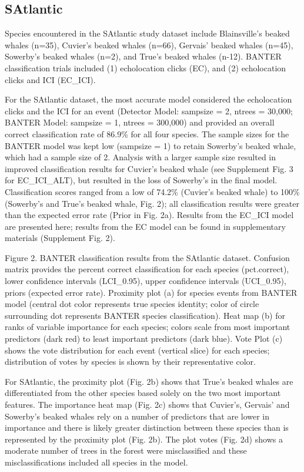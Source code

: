 \documentclass[
  letterpaper,
  DIV=11,
  numbers=noendperiod]{scrartcl}
\begin{document}
\hypertarget{satlantic}{%
\subsection{SAtlantic}\label{satlantic}}

Species encountered in the SAtlantic study dataset include Blainsville's
beaked whales (n=35), Cuvier's beaked whales (n=66), Gervais' beaked
whales (n=45), Sowerby's beaked whales (n=2), and True's beaked whales
(n-12). BANTER classification trials included (1) echolocation clicks
(EC), and (2) echolocation clicks and ICI (EC\_ICI).

For the SAtlantic dataset, the most accurate model considered the
echolocation clicks and the ICI for an event (Detector Model: sampsize =
2, ntrees = 30,000; BANTER Model: sampsize = 1, ntrees = 300,000) and
provided an overall correct classification rate of 86.9\% for all four
species. The sample sizes for the BANTER model was kept low (sampsize =
1) to retain Sowerby's beaked whale, which had a sample size of 2.
Analysis with a larger sample size resulted in improved classification
results for Cuvier's beaked whale (see Supplement Fig. 3 for
EC\_ICI\_ALT), but resulted in the loss of Sowerby's in the final model.
Classification scores ranged from a low of 74.2\% (Cuvier's beaked
whale) to 100\% (Sowerby's and True's beaked whale, Fig. 2); all
classification results were greater than the expected error rate (Prior
in Fig. 2a). Results from the EC\_ICI model are presented here; results
from the EC model can be found in supplementary materials (Supplement
Fig. 2).

Figure 2. BANTER classification results from the SAtlantic dataset.
Confusion matrix provides the percent correct classification for each
species (pct.correct), lower confidence intervals (LCI\_0.95), upper
confidence intervals (UCI\_0.95), priors (expected error rate).
Proximity plot (a) for species events from BANTER model (central dot
color represents true species identity; color of circle surrounding dot
represents BANTER species classification). Heat map (b) for ranks of
variable importance for each species; colors scale from most important
predictors (dark red) to least important predictors (dark blue). Vote
Plot (c) shows the vote distribution for each event (vertical slice) for
each species; distribution of votes by species is shown by their
representative color.

For SAtlantic, the proximity plot (Fig. 2b) shows that True's beaked
whales are differentiated from the other species based solely on the two
most important features. The importance heat map (Fig. 2c) shows that
Cuvier's, Gervais' and Sowerby's beaked whales rely on a number of
predictors that are lower in importance and there is likely greater
distinction between these species than is represented by the proximity
plot (Fig. 2b). The plot votes (Fig. 2d) shows a moderate number of
trees in the forest were misclassified and these misclassifications
included all species in the model.
\end{document}
